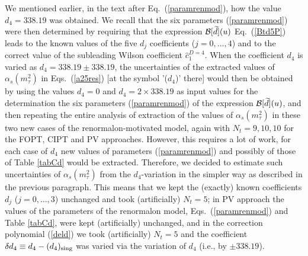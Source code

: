 \documentclass[aps,nofootinbib,showkeys,noshowpacs,preprintnumbers,amsmath,amssymb]{revtex4}
\newcommand{\td}{{\widetilde d}}
\begin{document}
We mentioned earlier, in the text after Eq.~(\ref{paramrenmod}), how the value $d_4=338.19$ was obtained. We recall that the six parameters (\ref{paramrenmod}) were then determined by requiring that the expression ${\cal B}[\td](u)$ Eq.~(\ref{Btd5P}) leads to the known values of the five $d_j$ coefficients ($j=0,\ldots,4$) and to the correct value of the subleading Wilson coefficient ${\hat c}_1^{D=4}$. When the coefficient $d_4$ is varied as $d_4 = 338.19 \pm 338.19$, the uncertainties of the extracted values of $\alpha_s(m^2_{\tau})$ in Eqs.~(\ref{a25res}) [at the symbol '($d_4$)' there] would then be obtained by using the values $d_4=0$ and $d_4= 2 \times 338.19$ as input values for the determination the six parameters (\ref{paramrenmod}) of the expression ${\cal B}[\td](u)$, and then repeating the entire analysis of extraction of the values of $\alpha_s(m^2_{\tau})$ in these two new cases of the renormalon-motivated model, again with $N_t=9, 10, 10$ for the FOPT, CIPT and PV approaches. However, this requires a lot of work, for each case of $d_4$ new values of parameters (\ref{paramrenmod}) and possibly of those of Table \ref{tabCd} would be extracted. Therefore, we decided to estimate such uncertainties of $\alpha_s(m^2_{\tau})$ from the $d_4$-variation in the simpler way as described in the previous paragraph. This means that we kept the (exactly) known coefficients $d_j$ ($j=0,\ldots,3$) unchanged and took (artificially) $N_t=5$; in PV approach the values of the parameters of the renormalon model, Eqs.~(\ref{paramrenmod}) and Table \ref{tabCd}, were kept (artificially) unchanged, and in the correction polynomial (\ref{deld}) we took (artificially) $N_t=5$ and the coefficient $\delta d_4 \equiv d_4 - (d_4)_{\rm sing}$ was varied via the variation of $d_4$  (i.e., by $\pm 338.19$).
\end{document}
